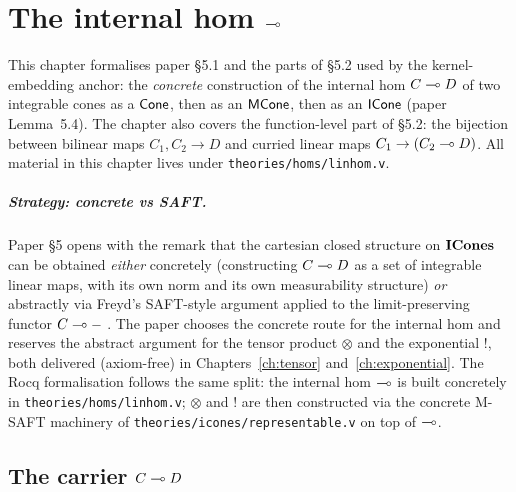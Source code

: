 %

\chapter{The internal hom \texorpdfstring{$\multimap$}{->}}\label{ch:linhom}

This chapter formalises paper \S5.1 and the parts of \S5.2 used by the
kernel-embedding anchor: the \emph{concrete} construction of the internal hom $C \multimap D$
of two integrable cones as a $\mathsf{Cone}$, then as an $\mathsf{MCone}$, then as an
$\mathsf{ICone}$ (paper Lemma~5.4). The chapter also covers the function-level
part of \S5.2: the bijection between bilinear maps $C_1, C_2 \to D$
and curried linear maps $C_1 \to (C_2 \multimap D)$. All material in this
chapter lives under \texttt{theories/homs/linhom.v}.

\paragraph{Strategy: concrete vs SAFT.}
Paper \S5 opens with the remark that the cartesian closed structure
on $\mathbf{ICones}$ can be obtained \emph{either} concretely (constructing
$C \multimap D$ as a set of integrable linear maps, with its own norm and
its own measurability structure) \emph{or} abstractly via Freyd's
SAFT-style argument applied to the limit-preserving functor
$C \multimap -\;$. The paper chooses the concrete route for the internal
hom and reserves the abstract argument for the tensor product
$\otimes$ and the exponential $\mathord{!}$, both delivered (axiom-free)
in Chapters~\ref{ch:tensor} and~\ref{ch:exponential}. The Rocq
formalisation follows the same split: the internal hom $\multimap$ is built
concretely in \texttt{theories/homs/linhom.v}; $\otimes$ and
$\mathord{!}$ are then constructed via the concrete M-SAFT machinery of
\texttt{theories/icones/representable.v} on top of $\multimap$.

\section{The carrier \texorpdfstring{$C \multimap D$}{C -> D}}\label{sec:linhom-carrier}

